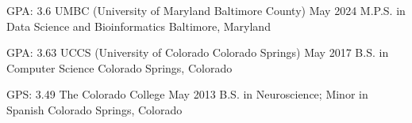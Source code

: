 

\begin{cventries}
  \cventry
    {GPA: 3.6}
    {UMBC (University of Maryland Baltimore County)} %
    {May 2024} %
    {M.P.S. in Data Science and Bioinformatics} %
    {Baltimore, Maryland} %
    
  \cventry
    {GPA: 3.63}
    {UCCS (University of Colorado Colorado Springs)} %
    {May 2017} %
    {B.S. in Computer Science} %
    {Colorado Springs, Colorado} %
    
  \cventry
    {GPS: 3.49}
    {The Colorado College} %
    {May 2013} %
    {B.S. in Neuroscience; Minor in Spanish} %
    {Colorado Springs, Colorado} %

\end{cventries}
